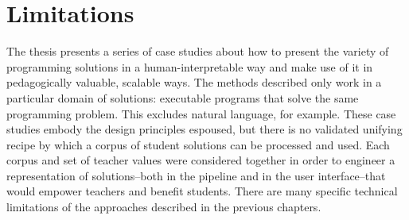 \documentclass[12pt,twoside]{mitthesis}
\begin{document}

\section{Limitations}

The thesis presents a series of case studies about how to present the variety of programming solutions in a human-interpretable way and make use of it in pedagogically valuable, scalable ways. The methods described only work in a particular domain of solutions: executable programs that solve the same programming problem. This excludes natural language, for example. These case studies embody the design principles espoused, but there is no validated unifying recipe by which a corpus of student solutions can be processed and used. Each corpus and set of teacher values were considered together in order to engineer a representation of solutions--both in the pipeline and in the user interface--that would empower teachers and benefit students. There are many specific technical limitations of the approaches described in the previous chapters. %



%


%
%
%
%
\end{document}
